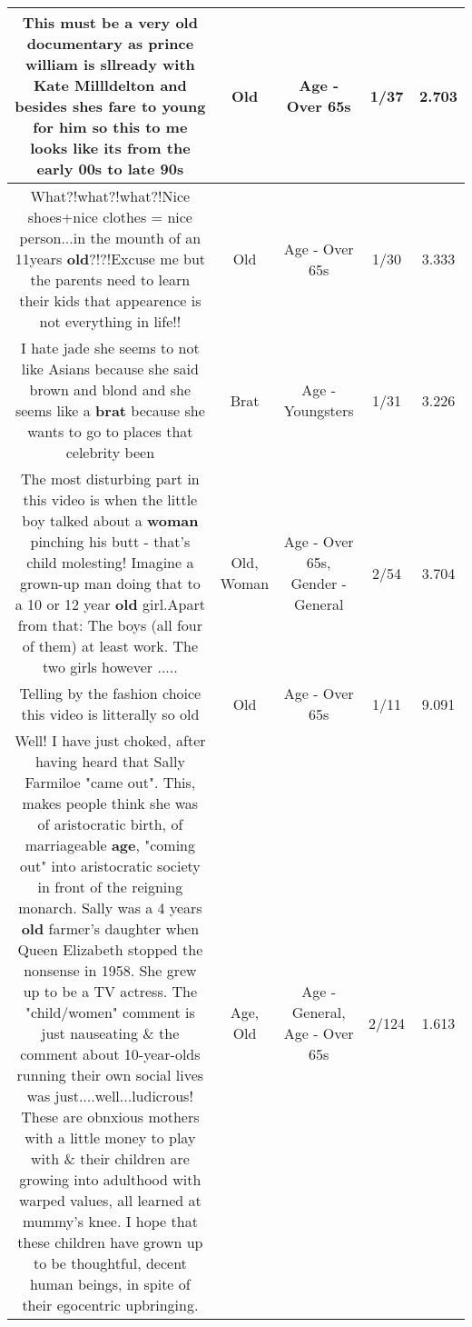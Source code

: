 \documentclass[11pt]{article}
\newlength\mylength
\begin{document}
\begin{center}
\begin{longtable}{|C{.65\mylength}|C{.30\mylength}|C{.12\mylength}|C{.12\mylength}|C{.12\mylength}|}
  \small This must be a very \textbf{old} documentary as prince william is sllready with Kate Millldelton and besides shes fare to young for him so this to me looks like its from the early 00s to late 90s\normalsize   & Old & Age - Over 65s & 1/37 & 2.703 \\  \hline
  \small What?!what?!what?!Nice shoes+nice clothes = nice person...in the mounth of an 11years \textbf{old}?!?!Excuse me but the parents need to learn their kids that appearence is not everything in life!!\normalsize   & Old & Age - Over 65s & 1/30 & 3.333 \\  \hline
  \small I️ hate jade she seems to  not like Asians because she said brown and blond and she seems like a  \textbf{brat} because she wants to go to places that celebrity been\normalsize   & Brat & Age - Youngsters & 1/31 & 3.226 \\  \hline
  \small The most disturbing part in this video is when the little boy talked about a \textbf{woman} pinching his butt - that's child molesting! Imagine a grown-up man doing that to a 10 or 12 year \textbf{old} girl.Apart from that: The boys (all four of them) at least work. The two girls however .....\normalsize   & Old, Woman & Age - Over 65s, Gender - General & 2/54 & 3.704 \\  \hline
  \small Telling by the fashion choice this video is litterally so old\normalsize   & Old & Age - Over 65s & 1/11 & 9.091 \\  \hline
  \small Well!  I have just choked, after having heard that Sally Farmiloe  "came out".  This, makes people think she  was of aristocratic birth, of marriageable \textbf{age}, "coming out" into aristocratic society in front of the reigning monarch.  Sally was a 4 years \textbf{old} farmer's daughter when Queen Elizabeth stopped the nonsense in 1958.  She grew up to be a TV actress. The "child/women" comment is just nauseating \& the comment about 10-year-olds running their own social lives was just....well...ludicrous!  These are obnxious mothers with a little  money to play with \& their children are growing into adulthood with warped values, all learned at mummy's knee.  I hope that these children have grown up to be thoughtful, decent human beings, in spite of their egocentric upbringing.\normalsize   & Age, Old & Age - General, Age - Over 65s & 2/124 & 1.613 \\  \hline

\end{longtable}
\end{center}
\end{document}
